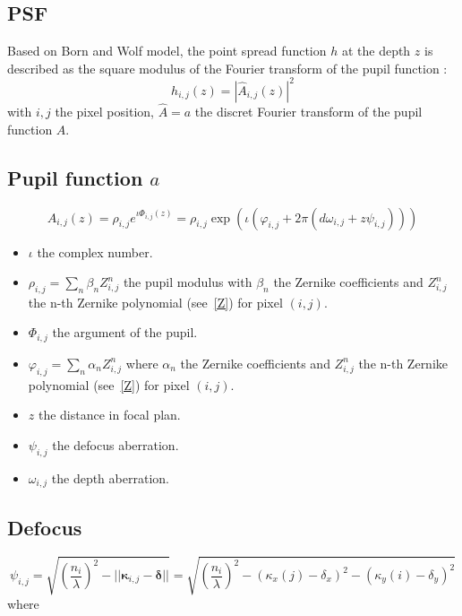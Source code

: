 \documentclass[a4paper]{article}
\begin{document}
\subsection{PSF}
Based on Born and Wolf model\cite{born}, the point spread function $h$ at the depth $z$ is described as the square modulus of the Fourier transform of the pupil function : 
\begin{equation}
h_{i,j}(z) = |\hat{A}_{i,j}(z)|^2
\end{equation}
with $i,j$ the pixel position, $\hat{A} = a$ the discret Fourier transform of the pupil function $A$.

\subsection{Pupil function $a$}
\begin{equation}
A_{i,j}(z) = \rho_{i,j} e^{\iota\Phi_{i,j}(z)} = \rho_{i,j} \exp( \iota(\varphi_{i,j} + 2\pi(d \omega_{i,j} + z \psi_{i,j})))
\end{equation}

\begin{itemize}
\item $\iota$ the complex number.
\item $\displaystyle{\rho_{i,j} = \sum_n \beta_n Z_{i,j}^n}$ the pupil modulus with $\beta_n$ the Zernike coefficients and $Z_{i,j}^n$ the n-th Zernike polynomial (see~\ref{Z}) for pixel $(i,j)$.
\item $\Phi_{i,j}$ the argument of the pupil.
\item $\displaystyle{\varphi_{i,j} = \sum_n \alpha_n Z_{i,j}^n}$ where $\alpha_n$ the Zernike coefficients and $Z_{i,j}^n$ the n-th Zernike polynomial (see~\ref{Z}) for pixel $(i,j)$.
\item $z$ the distance in focal plan.
\item $\psi_{i,j}$ the defocus aberration.
\item $\omega_{i,j}$ the depth aberration.
\end{itemize}

\subsection{Defocus}
\label{defocus}
\begin{equation}
\psi_{i,j} = \sqrt{\left(\frac{n_i}{\lambda}\right)^2 - ||\boldsymbol{\kappa}_{i,j} - \boldsymbol{\delta}||} =
\sqrt{\left(\frac{n_i}{\lambda}\right)^2 - (\kappa_x(j) - \delta_x)^2 -  (\kappa_y(i) - \delta_y)^2}
\end{equation}
where
\end{document}

